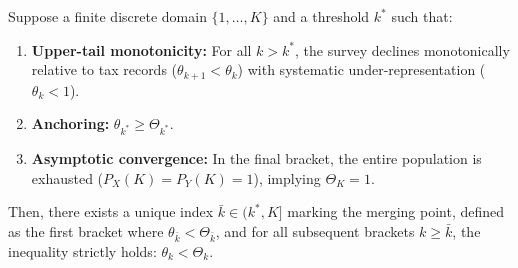 \begin{proposition}
Suppose a finite discrete domain $\{1, \dots, K\}$ and a threshold $k^*$ such that:
\begin{enumerate}
    \item \textbf{Upper-tail monotonicity:} For all $k > k^*$, the survey declines monotonically relative to tax records ($\theta_{k+1} < \theta_k$) with systematic under-representation ($\theta_k < 1$).
    \item \textbf{Anchoring:} $\theta_{k^*} \ge \Theta_{k^*}$.
    \item \textbf{Asymptotic convergence:} In the final bracket, the entire population is exhausted ($P_X(K) = P_Y(K) = 1$), implying $\Theta_K = 1$.
\end{enumerate}
Then, there exists a unique index $\bar{k} \in (k^*, K]$ marking the merging point, defined as the first bracket where $\theta_{\bar{k}} < \Theta_{\bar{k}}$, and for all subsequent brackets $k \ge \bar{k}$, the inequality strictly holds: $\theta_k < \Theta_k$.
\end{proposition}

